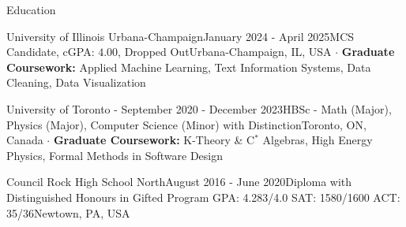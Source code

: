 \documentclass[UTF8]{resume} %
\begin{document}
\begin{rSection}{Education}
    \begin{rSubsection}{University of Illinois Urbana-Champaign}{January 2024 - April 2025}{MCS Candidate, cGPA: \(4.00\), Dropped Out}{Urbana-Champaign, IL, USA}
    $\cdot$ \textbf{Graduate Coursework:} Applied Machine Learning, Text Information Systems, Data Cleaning, Data Visualization
    \end{rSubsection}
    \begin{rSubsection}{University of Toronto - }{September 2020 - December 2023}{HBSc - Math (Major), Physics (Major), Computer Science (Minor) with Distinction}{Toronto, ON, Canada}
        $\cdot$ \textbf{Graduate Coursework:} K-Theory \& C$^*$ Algebras, High Energy Physics, Formal Methods in Software Design
    \end{rSubsection}
    \begin{rSubsection}{Council Rock High School North}{August 2016 - June 2020}{Diploma with Distinguished Honours in Gifted Program GPA: 4.283/4.0  SAT: 1580/1600  ACT: 35/36}{Newtown, PA, USA}

\end{rSubsection}
\end{rSection}
\end{document}
